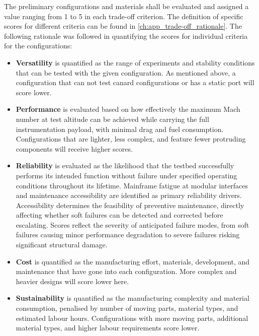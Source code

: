 The preliminary configurations and materials shall be evaluated and assigned a value ranging from 1 to 5 in each trade-off criterion. The definition of specific scores for different criteria can be found in \autoref{ch:app_trade-off_rationale}. The following rationale was followed in quantifying the scores for individual criteria for the configurations:
\begin{itemize}
    \item \textbf{Versatility} is quantified as the range of experiments and stability conditions that can be tested with the given configuration. As mentioned above, a configuration that can not test canard configurations or has a static port will score lower.
    \item \textbf{Performance }is evaluated based on how effectively the maximum Mach number at test altitude can be achieved while carrying the full instrumentation payload, with minimal drag and fuel consumption. Configurations that are lighter, less complex, and feature fewer protruding components will receive higher scores.
    \item \textbf{Reliability} is evaluated as the likelihood that the testbed successfully performs its intended function without failure under specified operating conditions throughout its lifetime. Mainframe fatigue at modular interfaces and maintenance accessibility are identified as primary reliability drivers. Accessibility determines the feasibility of preventive maintenance, directly affecting whether soft failures can be detected and corrected before escalating. Scores reflect the severity of anticipated failure modes, from soft failures causing minor performance degradation to severe failures risking significant structural damage.
    \item \textbf{Cost} is quantified as the manufacturing effort, materials, development, and maintenance that have gone into each configuration. More complex and heavier designs will score lower here.
    \item \textbf{Sustainability} is quantified as the manufacturing complexity and material consumption, penalised by number of moving parts, material types, and estimated labour hours. Configurations with more moving parts, additional material types, and higher labour requirements score lower.
\end{itemize}


